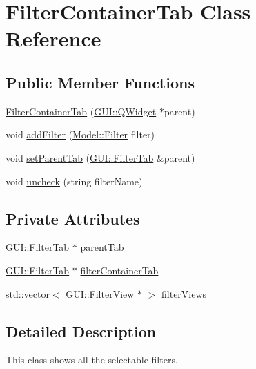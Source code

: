 \hypertarget{classGUI_1_1FilterContainerTab}{}\section{Filter\+Container\+Tab Class Reference}
\label{classGUI_1_1FilterContainerTab}
\subsection*{Public Member Functions}
\begin{DoxyCompactItemize}
\item 
\hyperlink{classGUI_1_1FilterContainerTab_aad3f3c3bfaf5046c5dd1d3fdecbc6a67}{Filter\+Container\+Tab} (\hyperlink{classGUI_1_1QWidget}{G\+U\+I\+::\+Q\+Widget} $\ast$parent)
\item 
void \hyperlink{classGUI_1_1FilterContainerTab_a91199aedb5655ad88d49a2c73b1b8854}{add\+Filter} (\hyperlink{classModel_1_1Filter}{Model\+::\+Filter} filter)
\item 
void \hyperlink{classGUI_1_1FilterContainerTab_aeca76c1062e211338acc4d20093ac1a5}{set\+Parent\+Tab} (\hyperlink{classGUI_1_1FilterTab}{G\+U\+I\+::\+Filter\+Tab} \&parent)
\item 
void \hyperlink{classGUI_1_1FilterContainerTab_afb7423e6c05af77b30334cce349ea4db}{uncheck} (string filter\+Name)
\end{DoxyCompactItemize}
\subsection*{Private Attributes}
\begin{DoxyCompactItemize}
\item 
\hyperlink{classGUI_1_1FilterTab}{G\+U\+I\+::\+Filter\+Tab} $\ast$ \hyperlink{classGUI_1_1FilterContainerTab_a321c854e2a631e394faad6e15ad10786}{parent\+Tab}
\item 
\hyperlink{classGUI_1_1FilterTab}{G\+U\+I\+::\+Filter\+Tab} $\ast$ \hyperlink{classGUI_1_1FilterContainerTab_a488c10510c6cacac9ce1a7615382b5df}{filter\+Container\+Tab}
\item 
std\+::vector$<$ \hyperlink{classGUI_1_1FilterView}{G\+U\+I\+::\+Filter\+View} $\ast$ $>$ \hyperlink{classGUI_1_1FilterContainerTab_a580e9a117be47e3b1e3c4234884118ec}{filter\+Views}
\end{DoxyCompactItemize}


\subsection{Detailed Description}
This class shows all the selectable filters. 

